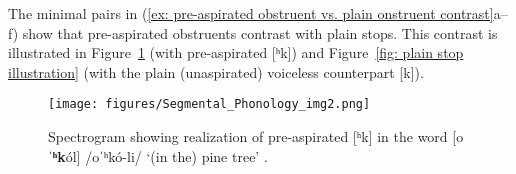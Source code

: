                                                 \label{ex: pre-aspirated obstruent vs. plain onstruent contrastl}
                                                    \label{ex: pre-aspirated obstruent vs. plain onstruent contrastm}
                                                        \label{ex: pre-aspirated obstruent vs. plain onstruent contrastn}
        \z
\z

The minimal pairs in (\ref{ex: pre-aspirated obstruent vs. plain onstruent contrast}a--f) show that pre-aspirated obstruents contrast with plain stops. This contrast is illustrated in Figure~\ref{fig: preaspirated stop illustration} (with pre-aspirated [ʰk]) and Figure~\ref{fig: plain stop illustration} (with the plain (unaspirated) voiceless counterpart [k]).

\begin{figure}
\texttt{[image: figures/Segmental\_Phonology\_img2.png]}
\caption{
\label{fig: preaspirated stop illustration}
Spectrogram showing realization of pre-aspirated [ʰk] in the word [o\textbf{ˈʰk}ól] /oˈʰkó-li/ ‘(in the) pine tree’ .}
\end{figure}

